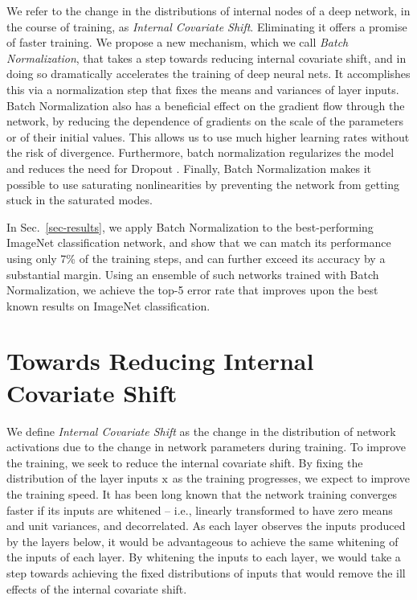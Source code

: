 \documentclass[twocolumn]{article}
\begin{document}
We refer to the change in the distributions of internal nodes of a
deep network, in the course of training, as {\em Internal Covariate Shift}. Eliminating it offers
a promise of faster training.  We propose a new mechanism, which we
call {\em Batch Normalization}, that takes a step towards reducing
internal covariate shift, and in doing so dramatically accelerates the
training of deep neural nets. It accomplishes this via a normalization
step that fixes the means and variances of layer inputs. Batch
Normalization also has a beneficial effect on the gradient flow
through the network, by reducing the dependence of gradients on the
scale of the parameters or of their initial values. This allows us to
use much higher learning rates without the risk of
divergence. Furthermore, batch normalization regularizes the model and
reduces the need for Dropout \cite{dropout}.  Finally, Batch
Normalization makes it possible to use saturating nonlinearities by
preventing the network from getting stuck in the saturated modes.

In Sec.~\ref{sec-results}, we apply Batch Normalization to the
best-performing ImageNet classification network, and show that we can
match its performance using only 7\% of the training steps, and can
further exceed its accuracy by a substantial margin.  Using an
ensemble of such networks trained with Batch Normalization, we achieve
the top-5 error rate that improves upon the best known results on
ImageNet classification.


\section{Towards Reducing Internal \mbox{Covariate} Shift}

We define {\em Internal Covariate Shift} as
the change in the
distribution of network activations due to the change in network parameters during training.  To improve the
training, we seek to reduce the internal covariate shift.  By fixing
the distribution of the layer inputs $\mathrm{x}$ as the training progresses,
we expect to improve the training speed.
%
It has been long known \cite{lecun-backprop,
  loglinear-training}
that the network training converges faster if its inputs are whitened -- i.e.,
linearly transformed to have zero means and unit variances, and  decorrelated. As each layer
observes the inputs produced by the layers below, it would be advantageous to
achieve the same whitening of the inputs of each layer.  By whitening the
inputs to each layer, we would take a step towards achieving the fixed
distributions of inputs that would remove the ill effects of the internal covariate shift.
\end{document}
